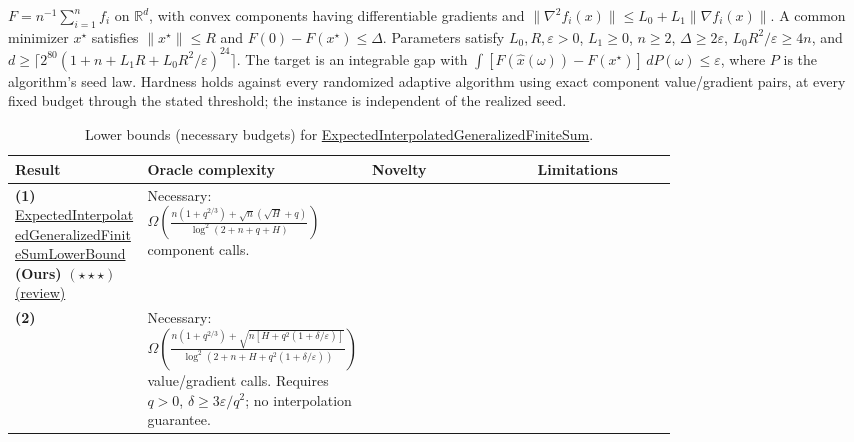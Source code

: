 \begin{table}[tp]
\centering
\caption{Lower bounds (necessary budgets) for \href{https://github.com/k3nfalt/longtails/blob/main/LongTails/Setups/ExpectedInterpolatedGeneralizedFiniteSum.lean}{ExpectedInterpolatedGeneralizedFiniteSum}.}\label{tab:ExpectedInterpolatedGeneralizedFiniteSum}
\parbox{\linewidth}{\footnotesize $F=n^{-1}\sum_{i=1}^n f_i$ on $\mathbb R^d$, with convex components having differentiable gradients and $\|\nabla^2 f_i(x)\|\le L_0+L_1\|\nabla f_i(x)\|$. A common minimizer $x^\star$ satisfies $\|x^\star\|\le R$ and $F(0)-F(x^\star)\le\Delta$. Parameters satisfy $L_0,R,\varepsilon>0$, $L_1\ge0$, $n\ge2$, $\Delta\ge2\varepsilon$, $L_0R^2/\varepsilon\ge4n$, and $d\ge\lceil2^{80}(1+n+L_1R+L_0R^2/\varepsilon)^{24}\rceil$. The target is an integrable gap with $\int [F(\hat x(\omega))-F(x^\star)]\,dP(\omega)\le\varepsilon$, where $P$ is the algorithm's seed law. Hardness holds against every randomized adaptive algorithm using exact component value/gradient pairs, at every fixed budget through the stated threshold; the instance is independent of the realized seed.}\par\smallskip
\begin{threeparttable}
\footnotesize
\setlength{\tabcolsep}{4pt}\renewcommand{\arraystretch}{1.25}
\begin{tabularx}{\linewidth}{@{}>{\raggedright\arraybackslash}p{0.20\linewidth}>{\raggedright\arraybackslash}p{0.32\linewidth}>{\raggedright\arraybackslash}p{0.25\linewidth}>{\raggedright\arraybackslash}X@{}}
\toprule
\textbf{Result} & \textbf{Oracle complexity} & \textbf{Novelty} & \textbf{Limitations} \\
\midrule
\textbf{(1)} \href{https://github.com/k3nfalt/longtails/blob/main/LongTails/Theorems/ExpectedInterpolatedGeneralizedFiniteSumLowerBound.lean}{Expected\allowbreak Interpolated\allowbreak Generalized\allowbreak Finite\allowbreak Sum\allowbreak Lower\allowbreak Bound} \textbf{(Ours)} $(\star\star\star)$ \href{https://github.com/k3nfalt/longtails/blob/main/scripts/reviews/ExpectedInterpolatedGeneralizedFiniteSumLowerBound.md}{(review)}
& Necessary: $\displaystyle\Omega\!\left(\frac{n(1+q^{2/3})+\sqrt n(\sqrt H+q)}{\log^2(2+n+q+H)}\right)$ component calls.
& & \\
\midrule[1.2pt]
\textbf{(2)} \citep[Thm.~7.1, v2]{polynomialEverestIIV2}
& Necessary: $\displaystyle\Omega\!\left(\frac{n(1+q^{2/3})+\sqrt{n[H+q^2(1+\delta/\varepsilon)]}}{\log^2(2+n+H+q^2(1+\delta/\varepsilon))}\right)$ value/gradient calls. Requires $q>0$, $\delta\ge3\varepsilon/q^2$; no interpolation guarantee.

\end{tabularx}
\end{threeparttable}
\end{table}
